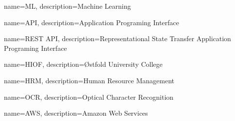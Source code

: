 \usepackage{glossaries}
\makeglossaries

 {
    name=ML,
    description={Machine Learning}
}

 {
    name=API,
    description={Application Programing Interface}
}

 {
    name=REST API,
    description={Representational State Transfer Application Programing Interface}
}

 {
    name=HIOF,
    description={Østfold University College}
}

 {
    name=HRM,
    description={Human Resource Management}
}

 {
    name=OCR,
    description={Optical Character Recognition}
}

 {
    name=AWS,
    description={Amazon Web Services}
}



